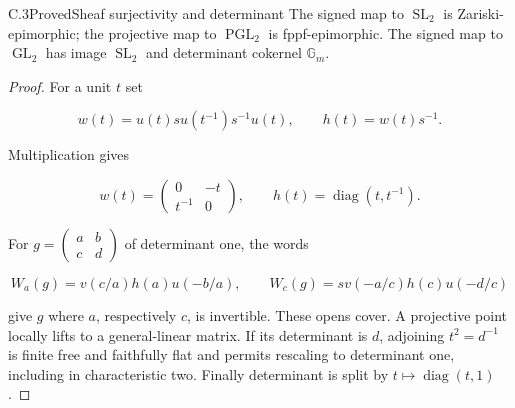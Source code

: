 \begin{statement}{C.3}{Proved}{Sheaf surjectivity and determinant}
The signed map to $\operatorname{SL}_2$ is Zariski-epimorphic;
the projective map to $\operatorname{PGL}_2$ is fppf-epimorphic.
The signed map to $\operatorname{GL}_2$ has image
$\operatorname{SL}_2$ and determinant cokernel $\mathbb G_m$.
\end{statement}
\begin{proof}
For a unit $t$ set

$$
w(t)=u(t)su(t^{-1})s^{-1}u(t),\qquad h(t)=w(t)s^{-1}.
$$

Multiplication gives

$$
w(t)=\begin{pmatrix}0&-t\\t^{-1}&0\end{pmatrix},\qquad
 h(t)=\operatorname{diag}(t,t^{-1}).
$$

For $g=\left(\begin{smallmatrix}a&b\\c&d\end{smallmatrix}\right)$
of determinant one, the words

$$
W_a(g)=v(c/a)h(a)u(-b/a),\qquad
 W_c(g)=sv(-a/c)h(c)u(-d/c)
$$

give $g$ where $a$, respectively $c$, is invertible.
These opens cover. A projective point locally lifts to a
general-linear matrix. If its determinant is $d$, adjoining
$t^2=d^{-1}$ is finite free and faithfully flat and permits
rescaling to determinant one, including in characteristic two.
Finally determinant is split by $t\mapsto\operatorname{diag}(t,1)$.
\end{proof}

